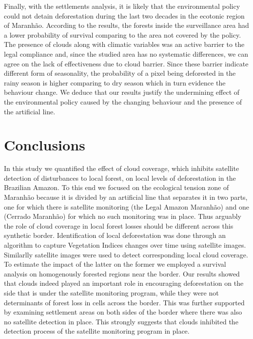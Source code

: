 Finally, with the settlements analysis, it is likely that the environmental policy could not detain deforestation during the last two decades in the ecotonic region of Maranhão. According to the results, the forests inside the surveillance area had a lower probability of survival comparing to the area not covered by the policy. The presence of clouds along with climatic variables was an active barrier to the legal compliance and, since the studied area has no systematic differences, we can agree on the lack of effectiveness due to cloud barrier. Since these barrier indicate different form of seasonality, the probability of a pixel being deforested in the rainy season is higher comparing to dry season which in turn evidence the behaviour change. We deduce that our results justify the undermining effect of the environmental policy caused by the changing behaviour and the presence of the artificial line.

\section{Conclusions}
\label{S:6}


In this study we quantified the effect of cloud coverage, which inhibits satellite detection of disturbances to local forest, on local levels of deforestation in the Brazilian Amazon. To this end we focused on the ecological tension zone of Maranhão because it is divided by an artificial line that separates it in two  parts, one for which there is satellite monitoring (the Legal Amazon Maranhão)  and one (Cerrado Maranhão) for which no such monitoring was in place.  Thus arguably the role of cloud coverage in local forest losses should be different across this synthetic border.  Identification of local deforestation was done through an algorithm to capture Vegetation Indices changes over time using satellite images.  Similarlly satellite images were used to detect corresponding local cloud coverage.  To estimate the impact of the latter on the former we employed a survival analysis on homogenously forested regions near the border. Our results showed that clouds indeed played an important role in encouraging deforestation on the side that is under the satellite monitoring program, while they were not determinants of forest loss in cells across the border. This was further supported by examining settlement areas on both sides of the border where there was also no satellite detection in place.  This strongly suggests that clouds inhibited the detection process of the satellite monitoring program in place.   

